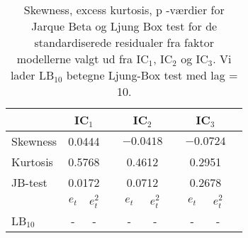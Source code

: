 \begin{table}
\center
\begin{tabular}{lccccccccc} \toprule
& \multicolumn{2}{c}{IC$_1$} & & \multicolumn{2}{c}{IC$_2$} & &\multicolumn{2}{c}{IC$_3$} \\ \midrule
Skewness & \multicolumn{2}{c}{0.0444} & & \multicolumn{2}{c}{$-0.0418$}  & & \multicolumn{2}{c}{$-0.0724$}   \\
Kurtosis & \multicolumn{2}{c}{0.5768} & & \multicolumn{2}{c}{0.4612}  & & \multicolumn{2}{c}{0.2951}\\
JB-test & \multicolumn{2}{c}{0.0172} & & \multicolumn{2}{c}{0.0712}  & & \multicolumn{2}{c}{0.2678} \\ \cmidrule{2-3}\cmidrule{5-6} \cmidrule{8-9} 
& $e_t$ & $e_t^2$ && $e_t$ & $e_t^2$  && $e_t$ & $e_t^2$  \\
LB$_{10}$ & -  &  - && -  &  -&& - & - \\ \bottomrule
\end{tabular}
\caption{Skewness, excess kurtosis, p -værdier for Jarque Beta og Ljung Box test for de standardiserede residualer fra faktor modellerne valgt ud fra IC$_1$, IC$_2$ og IC$_3$. Vi lader LB$_{10}$ betegne Ljung-Box test med lag = 10. } \label{tab:test_faktor}
\end{table}